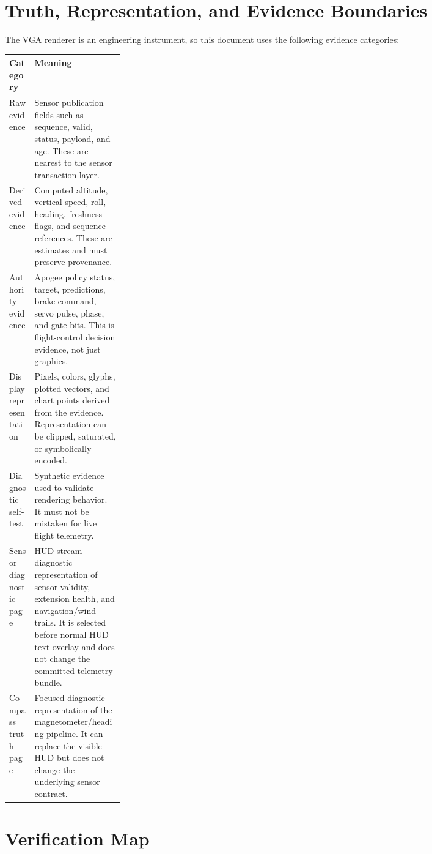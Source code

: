 \documentclass{article}
\begin{document}
\section{Truth, Representation, and Evidence Boundaries}

The VGA renderer is an engineering instrument, so this document uses the
following evidence categories:

\begin{center}
\begin{tabularx}{\linewidth}{p{0.22\linewidth} X}
\toprule
\textbf{Category} & \textbf{Meaning} \\
\midrule
Raw evidence &
Sensor publication fields such as sequence, valid, status, payload, and age.
These are nearest to the sensor transaction layer. \\

Derived evidence &
Computed altitude, vertical speed, roll, heading, freshness flags, and sequence
references.  These are estimates and must preserve provenance. \\

Authority evidence &
Apogee policy status, target, predictions, brake command, servo pulse, phase,
and gate bits.  This is flight-control decision evidence, not just graphics. \\

Display representation &
Pixels, colors, glyphs, plotted vectors, and chart points derived from the
evidence.  Representation can be clipped, saturated, or symbolically encoded. \\

Diagnostic self-test &
Synthetic evidence used to validate rendering behavior.  It must not be
mistaken for live flight telemetry. \\

Sensor diagnostic page &
HUD-stream diagnostic representation of sensor validity, extension health, and
navigation/wind trails.  It is selected before normal HUD text overlay and does
not change the committed telemetry bundle. \\

Compass truth page &
Focused diagnostic representation of the magnetometer/heading pipeline.  It
can replace the visible HUD but does not change the underlying sensor contract. \\
\bottomrule
\end{tabularx}
\end{center}

\section{Verification Map}
\end{document}

